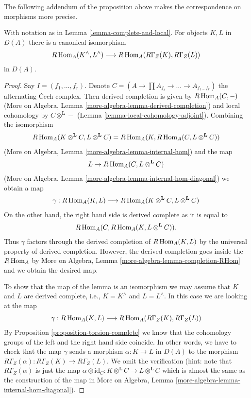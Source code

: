\noindent
The following addendum of the proposition above makes the
correspondence on morphisms more precise.

\begin{lemma}
\label{lemma-compare-RHom}
With notation as in Lemma \ref{lemma-complete-and-local}.
For objects $K, L$ in $D(A)$ there is a canonical isomorphism
$$
R\mathop{\mathrm{Hom}}\nolimits_A(K^\wedge, L^\wedge) \longrightarrow R\mathop{\mathrm{Hom}}\nolimits_A(R\Gamma_Z(K), R\Gamma_Z(L))
$$
in $D(A)$.
\end{lemma}

\begin{proof}
Say $I = (f_1, \ldots, f_r)$. Denote
$C = (A \to \prod A_{f_i} \to \ldots \to A_{f_1 \ldots f_r})$ the
alternating {\v C}ech complex. Then derived completion is given by
$R\mathop{\mathrm{Hom}}\nolimits_A(C, -)$ (More on Algebra, Lemma
\ref{more-algebra-lemma-derived-completion}) and local cohomology by
$C \otimes^\mathbf{L} -$ (Lemma \ref{lemma-local-cohomology-adjoint}).
Combining the isomorphism
$$
R\mathop{\mathrm{Hom}}\nolimits_A(K \otimes^\mathbf{L} C, L \otimes^\mathbf{L} C) =
R\mathop{\mathrm{Hom}}\nolimits_A(K, R\mathop{\mathrm{Hom}}\nolimits_A(C,  L \otimes^\mathbf{L} C))
$$
(More on Algebra, Lemma \ref{more-algebra-lemma-internal-hom})
and the map
$$
L \to R\mathop{\mathrm{Hom}}\nolimits_A(C,  L \otimes^\mathbf{L} C)
$$
(More on Algebra, Lemma \ref{more-algebra-lemma-internal-hom-diagonal})
we obtain a map
$$
\gamma :
R\mathop{\mathrm{Hom}}\nolimits_A(K, L)
\longrightarrow
R\mathop{\mathrm{Hom}}\nolimits_A(K \otimes^\mathbf{L} C, L \otimes^\mathbf{L} C)
$$
On the other hand, the right hand side is derived complete as it is
equal to
$$
R\mathop{\mathrm{Hom}}\nolimits_A(C, R\mathop{\mathrm{Hom}}\nolimits_A(K, L \otimes^\mathbf{L} C)).
$$
Thus $\gamma$ factors through the derived completion of
$R\mathop{\mathrm{Hom}}\nolimits_A(K, L)$ by the universal property of derived completion.
However, the derived completion goes inside the $R\mathop{\mathrm{Hom}}\nolimits_A$ by
More on Algebra, Lemma \ref{more-algebra-lemma-completion-RHom}
and we obtain the desired map.

\medskip\noindent
To show that the map of the lemma is an isomorphism
we may assume that $K$ and $L$ are derived complete, i.e.,
$K = K^\wedge$ and $L = L^\wedge$. In this case we are
looking at the map
$$
\gamma : R\mathop{\mathrm{Hom}}\nolimits_A(K, L) \longrightarrow R\mathop{\mathrm{Hom}}\nolimits_A(R\Gamma_Z(K), R\Gamma_Z(L))
$$
By Proposition \ref{proposition-torsion-complete} we know that
the cohomology groups
of the left and the right hand side coincide. In other words,
we have to check that the map $\gamma$ sends a morphism
$\alpha : K \to L$ in $D(A)$ to the morphism
$R\Gamma_Z(\alpha) : R\Gamma_Z(K) \to R\Gamma_Z(L)$.
We omit the verification (hint: note that $R\Gamma_Z(\alpha)$
is just the map
$\alpha \otimes \text{id}_C :
K \otimes^\mathbf{L} C
\to
L \otimes^\mathbf{L} C$ which is almost the same as the
construction of the map in
More on Algebra, Lemma \ref{more-algebra-lemma-internal-hom-diagonal}).
\end{proof}

